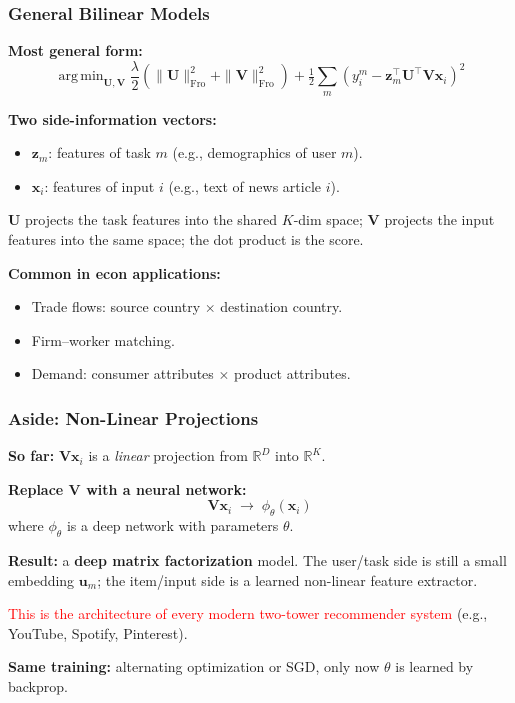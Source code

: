\documentclass[notes,11pt, aspectratio=169]{beamer}
\DeclareMathOperator*{\argmin}{arg\,min}
\newcommand{\vx}{\mathbf{x}}
\newcommand{\vu}{\mathbf{u}}
\newcommand{\vU}{\mathbf{U}}
\newcommand{\vV}{\mathbf{V}}
\newcommand{\R}{\mathbb{R}}
\newcommand{\Frob}{\mathrm{Fro}}
\begin{document}
\begin{frame}
\frametitle{General Bilinear Models}

\textbf{Most general form:}
\[
    \argmin_{\vU, \vV} \frac{\lambda}{2}(\|\vU\|_\Frob^2 + \|\vV\|_\Frob^2) + \tfrac{1}{2} \sum_m (y_i^m - \mathbf{z}_m^\top \vU^\top \vV \vx_i)^2
\]

\vspace{6pt}
\textbf{Two side-information vectors:}
\begin{itemize}
    \item $\mathbf{z}_m$: features of task $m$ (e.g., demographics of user $m$).
    \item $\vx_i$: features of input $i$ (e.g., text of news article $i$).
\end{itemize}

\vspace{6pt}
$\vU$ projects the task features into the shared $K$-dim space; $\vV$ projects the input features into the same space; the dot product is the score.

\vspace{8pt}
\textbf{Common in econ applications:}
\begin{itemize}
    \item Trade flows: source country $\times$ destination country.
    \item Firm--worker matching.
    \item Demand: consumer attributes $\times$ product attributes.
\end{itemize}
\end{frame}

\begin{frame}
\frametitle{Aside: Non-Linear Projections}

\textbf{So far:} $\vV \vx_i$ is a \emph{linear} projection from $\R^D$ into $\R^K$.

\vspace{8pt}
\textbf{Replace $\vV$ with a neural network:}
\[
    \vV \vx_i \;\longrightarrow\; \phi_\theta(\vx_i)
\]
where $\phi_\theta$ is a deep network with parameters $\theta$.

\vspace{8pt}
\textbf{Result:} a \textbf{deep matrix factorization} model. The user/task side is still a small embedding $\vu_m$; the item/input side is a learned non-linear feature extractor.

\vspace{8pt}
\textcolor{red}{This is the architecture of every modern two-tower recommender system} (e.g., YouTube, Spotify, Pinterest).

\vspace{4pt}
\textbf{Same training:} alternating optimization or SGD, only now $\theta$ is learned by backprop.
\end{frame}
\end{document}
